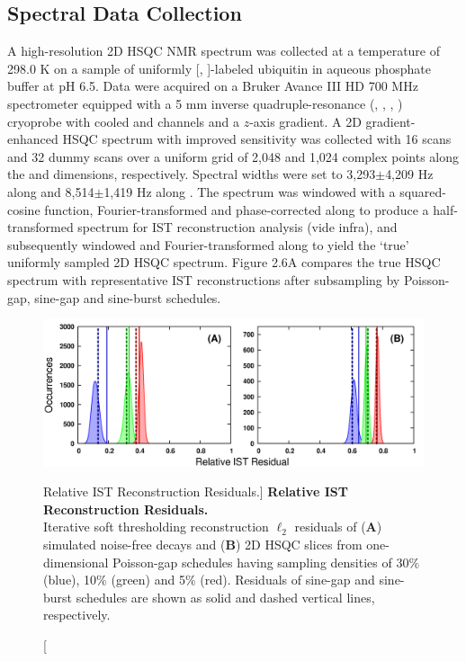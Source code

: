 \subsection{Spectral Data Collection}

\begin{doublespace}
A high-resolution 2D \hnnmr{} HSQC NMR spectrum was collected at a temperature
of 298.0 K on a sample of uniformly [\nnmr{}, \cnmr{}]-labeled ubiquitin in
aqueous phosphate buffer at pH 6.5. Data were acquired on a Bruker Avance
III HD 700 MHz spectrometer equipped with a 5 mm inverse quadruple-resonance
(\hnmr{}, \cnmr{}, \nnmr{}, \pnmr{}) cryoprobe with cooled \hnmr{} and \cnmr{}
channels and a $z$-axis gradient. A 2D gradient-enhanced \hnnmr{} HSQC spectrum
with improved sensitivity \cite{kay:jacs1992,palmer:jmr1991} was collected with
16 scans and 32 dummy scans over a uniform grid of 2,048 and 1,024 complex
points along the \hnmr{} and \nnmr{} dimensions, respectively. Spectral widths
were set to 3,293$\pm$4,209 Hz along \hnmr{} and 8,514$\pm$1,419 Hz along
\nnmr{}. The spectrum was windowed with a squared-cosine function,
Fourier-transformed and phase-corrected along \hnmr{} to produce a
half-transformed spectrum for IST reconstruction analysis (vide infra),
and subsequently windowed and Fourier-transformed along \nnmr{} to yield the
`true' uniformly sampled 2D \hnnmr{} HSQC spectrum. Figure 2.6A compares the
true HSQC spectrum with representative IST reconstructions after subsampling
by Poisson-gap, sine-gap and sine-burst schedules.
\end{doublespace}

\begin{figure}[ht!]
\includegraphics[width=6.5in]{figs/dgs/07-residuals.png}
\caption
      [Relative IST Reconstruction Residuals.]{
  {\bf Relative IST Reconstruction Residuals.}
  \\
  Iterative soft thresholding reconstruction $\ell_2$ residuals of ({\bf A})
  simulated noise-free decays and ({\bf B}) 2D \hnnmr{} HSQC slices from
  one-dimensional Poisson-gap schedules having sampling densities of
  30\% (blue), 10\% (green) and 5\% (red). Residuals of sine-gap and sine-burst
  schedules are shown as solid and dashed vertical lines, respectively.
}
\end{figure}

